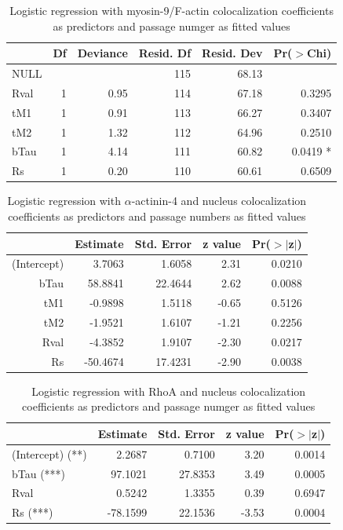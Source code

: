 \documentclass[num-refs]{wiley-article}
\begin{document}
\begin{table}[hbt!]
  \caption{Logistic regression with myosin-9/F-actin colocalization coefficients as predictors and passage numger as fitted values}
  \label{glm-M9-Fact}
\centering
\begin{tabular}{lrrrrr}
  \hline
 & Df & Deviance & Resid. Df & Resid. Dev & Pr($>$Chi) \\
  \hline
NULL &  &  & 115 & 68.13 &  \\
  Rval & 1 & 0.95 & 114 & 67.18 & 0.3295 \\
  tM1 & 1 & 0.91 & 113 & 66.27 & 0.3407 \\
  tM2 & 1 & 1.32 & 112 & 64.96 & 0.2510 \\
  bTau & 1 & 4.14 & 111 & 60.82 & 0.0419 * \\
  Rs & 1 & 0.20 & 110 & 60.61 & 0.6509 \\
   \hline
\end{tabular}
\end{table}

\begin{table}[hbt!]
  \caption{Logistic regression with $\alpha$-actinin-4 and nucleus colocalization coefficients as predictors and passage numbers as fitted values}
  \label{glm-aA4-nuc}
\centering
\begin{tabular}{rrrrr}
  \hline
 & Estimate & Std. Error & z value & Pr($>$$|$z$|$) \\
  \hline
(Intercept) & 3.7063 & 1.6058 & 2.31 & 0.0210 \\
  bTau & 58.8841 & 22.4644 & 2.62 & 0.0088 \\
  tM1 & -0.9898 & 1.5118 & -0.65 & 0.5126 \\
  tM2 & -1.9521 & 1.6107 & -1.21 & 0.2256 \\
  Rval & -4.3852 & 1.9107 & -2.30 & 0.0217 \\
  Rs & -50.4674 & 17.4231 & -2.90 & 0.0038 \\
   \hline
\end{tabular}
\end{table}

\begin{table}[hbt!]
  \caption{Logistic regression with RhoA and nucleus colocalization coefficients as predictors and passage numger as fitted values}
  \label{glm-RhoA-nuc}
\centering
\begin{tabular}{l|rrrr}
  \hline
 & Estimate & Std. Error & z value & Pr($>$$|$z$|$) \\
  \hline
(Intercept) (**) & 2.2687 & 0.7100 & 3.20 & 0.0014 \\
  bTau (***) & 97.1021 & 27.8353 & 3.49 & 0.0005 \\
  Rval & 0.5242 & 1.3355 & 0.39 & 0.6947 \\
  Rs (***) & -78.1599 & 22.1536 & -3.53 & 0.0004 \\
   \hline
\end{tabular}
\end{table}
\end{document}
